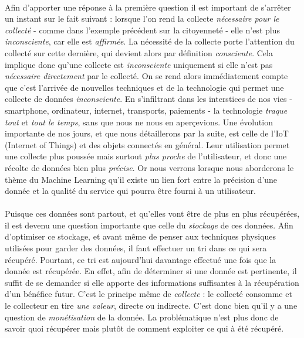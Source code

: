 \paragraph{} Afin d'apporter une réponse à la première question il est important de s'arrêter un instant sur le fait
suivant : lorsque l'on rend la collecte \emph{nécessaire pour le collecté} - comme dans l'exemple précédent sur la
citoyenneté - elle n'est plus \emph{inconsciente}, car elle est \emph{affirmée}. La nécessité de la collecte porte
l'attention du collecté sur cette dernière, qui devient alors par définition \emph{consciente}. Cela
implique donc qu'une collecte est \emph{inconsciente} uniquement si elle n'est pas \emph{nécessaire directement}
par le collecté. On se rend alors immédiatement compte que c'est l'arrivée de nouvelles techniques et de la
technologie qui permet une collecte de données \emph{inconsciente}. En s'infiltrant dans les interstices de nos vies -
smartphone, ordinateur, internet, transports, paiements - la technologie \emph{traque tout} et \emph{tout le temps},
sans que nous ne nous en aperçevions. Une évolution importante de nos jours, et que nous détaillerons par la suite, est
celle de l'IoT (Internet of Things) et des objets connectés en général. Leur utilisation permet une collecte plus
poussée mais surtout \emph{plus proche} de l'utilisateur, et donc une récolte de données bien plus \emph{précise}. Or
nous verrons lorsque nous aborderons le thème du Machine Learning qu'il existe un lien fort entre la précision d'une
donnée et la qualité du service qui pourra être fourni à un utilisateur.

\paragraph{} Puisque ces données sont partout, et qu'elles vont être de plus en plus récupérées, il est devenu
une question importante que celle du \emph{stockage} de ces données. Afin d'optimiser ce stockage, et avant même de
penser aux techniques physiques utilisées pour garder des données, il faut effectuer un tri dans ce qui sera récupéré.
Pourtant, ce tri est aujourd'hui davantage effectué une fois que la donnée est récupérée. En effet, afin de déterminer
si une donnée est pertinente, il suffit de se demander si elle apporte des informations suffisantes à la récupération
d'un bénéfice futur. C'est le principe même de \emph{collecte} : le collecté consomme et le collecteur en tire \emph{
une valeur}, directe ou indirecte. C'est donc bien qu'il y a une question de \emph{monétisation} de la donnée. La
problématique n'est plus donc de savoir quoi récupérer mais plutôt de comment exploiter ce qui à été récupéré.

